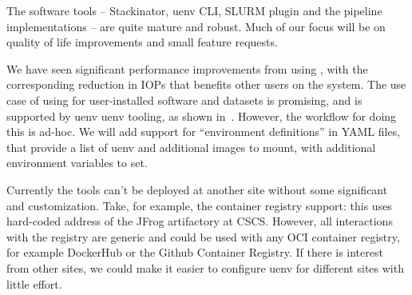 The software tools -- Stackinator, uenv CLI, SLURM plugin and the pipeline implementations -- are quite mature and robust.
Much of our focus will be on quality of life improvements and small feature requests.

We have seen significant performance improvements from using \squashfs, with the corresponding reduction in IOPs that benefits other users on the system.
The use case of using \squashfs for user-installed software and datasets is promising, and is supported by uenv uenv tooling, as shown in~.
However, the workflow for doing this is ad-hoc.
We will add support for ``environment definitions'' in YAML files, that provide a list of uenv and additional \squashfs images to mount, with additional environment variables to set.

Currently the tools can't be deployed at another site without some significant and customization.
Take, for example, the container registry support: this uses hard-coded address of the JFrog artifactory at CSCS.
However, all interactions with the registry are generic and could be used with any OCI container registry, for example DockerHub or the Github Container Registry.
If there is interest from other sites, we could make it easier to configure uenv for different sites with little effort.
